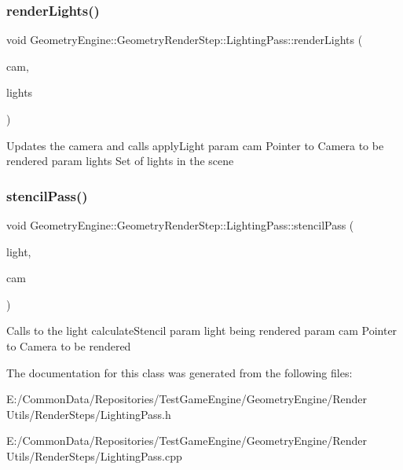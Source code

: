 \subsubsection{\texorpdfstring{renderLights()}{renderLights()}}
{\footnotesize\ttfamily void Geometry\+Engine\+::\+Geometry\+Render\+Step\+::\+Lighting\+Pass\+::render\+Lights (\begin{DoxyParamCaption}\item[{\mbox{\hyperlink{class_geometry_engine_1_1_geometry_world_item_1_1_geometry_camera_1_1_camera}{Geometry\+World\+Item\+::\+Geometry\+Camera\+::\+Camera}} $\ast$}]{cam,  }\item[{std\+::unordered\+\_\+set$<$ \mbox{\hyperlink{class_geometry_engine_1_1_geometry_world_item_1_1_geometry_light_1_1_light}{Geometry\+World\+Item\+::\+Geometry\+Light\+::\+Light}} $\ast$ $>$ $\ast$}]{lights }\end{DoxyParamCaption})\hspace{0.3cm}{\ttfamily [protected]}}

Updates the camera and calls apply\+Light param cam Pointer to Camera to be rendered param lights Set of lights in the scene \mbox{\label{class_geometry_engine_1_1_geometry_render_step_1_1_lighting_pass_a42b7f335d4bebdbdd06c3bef142844c0}} 
\subsubsection{\texorpdfstring{stencilPass()}{stencilPass()}}
{\footnotesize\ttfamily void Geometry\+Engine\+::\+Geometry\+Render\+Step\+::\+Lighting\+Pass\+::stencil\+Pass (\begin{DoxyParamCaption}\item[{\mbox{\hyperlink{class_geometry_engine_1_1_geometry_world_item_1_1_geometry_light_1_1_light}{Geometry\+World\+Item\+::\+Geometry\+Light\+::\+Light}} $\ast$}]{light,  }\item[{\mbox{\hyperlink{class_geometry_engine_1_1_geometry_world_item_1_1_geometry_camera_1_1_camera}{Geometry\+World\+Item\+::\+Geometry\+Camera\+::\+Camera}} $\ast$}]{cam }\end{DoxyParamCaption})\hspace{0.3cm}{\ttfamily [protected]}}

Calls to the light calculate\+Stencil param light being rendered param cam Pointer to Camera to be rendered 

The documentation for this class was generated from the following files\+:\begin{DoxyCompactItemize}
\item 
E\+:/\+Common\+Data/\+Repositories/\+Test\+Game\+Engine/\+Geometry\+Engine/\+Render Utils/\+Render\+Steps/Lighting\+Pass.\+h\item 
E\+:/\+Common\+Data/\+Repositories/\+Test\+Game\+Engine/\+Geometry\+Engine/\+Render Utils/\+Render\+Steps/Lighting\+Pass.\+cpp\end{DoxyCompactItemize}
